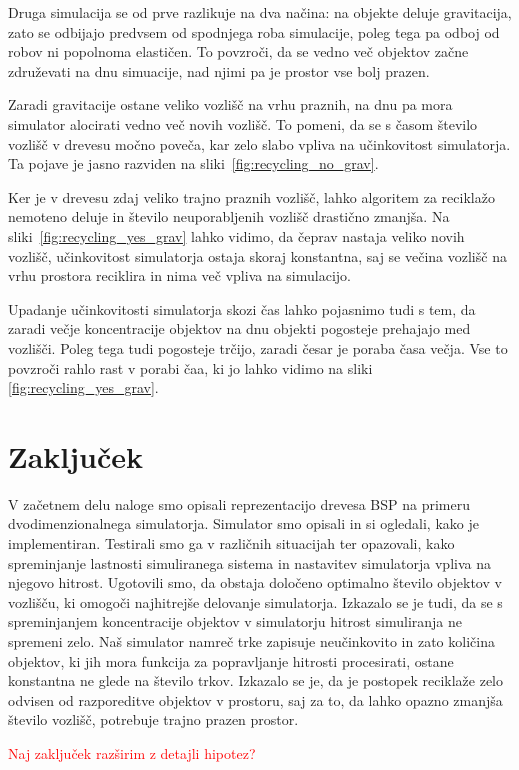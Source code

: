 \documentclass[a4paper,12pt]{article}
\begin{document}
Druga simulacija se od prve razlikuje na dva načina: na objekte deluje gravitacija, zato se odbijajo predvsem od spodnjega
roba simulacije, poleg tega pa odboj od robov ni popolnoma elastičen. To povzroči, da se vedno več objektov začne združevati
na dnu simuacije, nad njimi pa je prostor vse bolj prazen.

Zaradi gravitacije ostane veliko vozlišč na vrhu praznih, na dnu pa mora simulator alocirati vedno več novih vozlišč.
To pomeni, da se s časom število vozlišč v drevesu močno poveča, kar zelo slabo vpliva na učinkovitost simulatorja.
Ta pojave je jasno razviden na sliki~\ref{fig:recycling_no_grav}.

Ker je v drevesu zdaj veliko trajno praznih vozlišč, lahko algoritem za reciklažo nemoteno deluje in število neuporabljenih
vozlišč drastično zmanjša. Na sliki~\ref{fig:recycling_yes_grav} lahko vidimo, da čeprav nastaja veliko novih vozlišč, 
učinkovitost simulatorja ostaja skoraj konstantna, saj se večina vozlišč na vrhu prostora reciklira in nima več vpliva
na simulacijo.

Upadanje učinkovitosti simulatorja skozi čas lahko pojasnimo tudi s tem, da zaradi večje koncentracije objektov na dnu
objekti pogosteje prehajajo med vozlišči. Poleg tega tudi pogosteje trčijo, zaradi česar je poraba časa večja.
Vse to povzroči rahlo rast v porabi čaa, ki jo lahko vidimo na sliki \ref{fig:recycling_yes_grav}.
\clearpage
\section{Zaključek}
V začetnem delu naloge smo opisali reprezentacijo drevesa BSP na primeru dvodimenzionalnega simulatorja.
Simulator smo opisali in si ogledali, kako je implementiran. Testirali smo ga v različnih situacijah
ter opazovali, kako spreminjanje lastnosti simuliranega sistema in nastavitev simulatorja vpliva na
njegovo hitrost. Ugotovili smo, da obstaja določeno optimalno število objektov v vozlišču, ki omogoči
najhitrejše delovanje simulatorja. Izkazalo se je tudi, da se s spreminjanjem koncentracije objektov v
simulatorju hitrost simuliranja ne spremeni zelo. Naš simulator namreč trke zapisuje neučinkovito
in zato količina objektov, ki jih mora funkcija za popravljanje hitrosti procesirati, ostane konstantna
ne glede na število trkov. Izkazalo se je, da je postopek reciklaže  zelo odvisen od razporeditve objektov
v prostoru, saj za to, da lahko opazno zmanjša število vozlišč, potrebuje trajno prazen prostor.

\textcolor{red}{Naj zaključek razširim z detajli hipotez?}
\clearpage
\lstlistoflistings{}
\listoffigures{}


\end{document}
